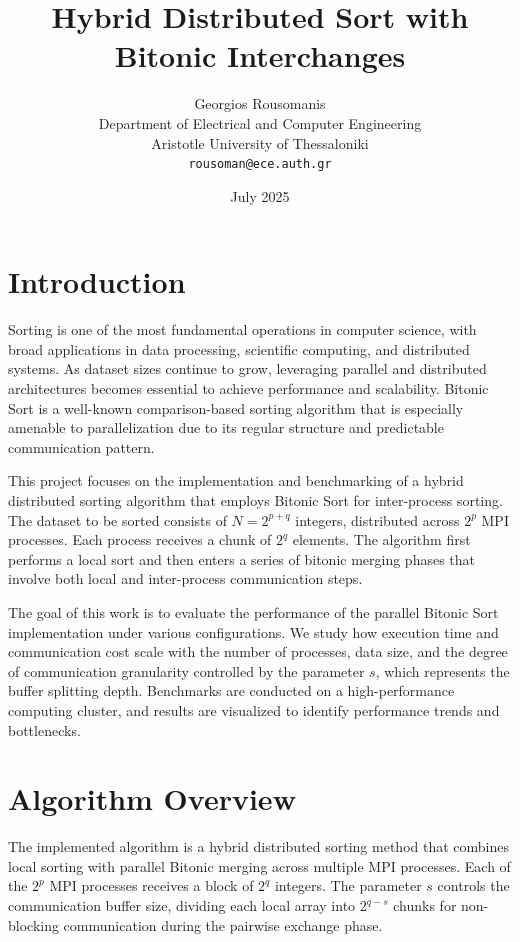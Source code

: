 \documentclass{article}
\title{Hybrid Distributed Sort with Bitonic Interchanges}
\author{Georgios Rousomanis \\
Department of Electrical and Computer Engineering \\
Aristotle University of Thessaloniki \\
\texttt{rousoman@ece.auth.gr}}
\date{July 2025}
\begin{document}
\maketitle

\section{Introduction}

Sorting is one of the most fundamental operations in computer science, with broad applications in data 
processing, scientific computing, and distributed systems. As dataset sizes continue to grow, leveraging 
parallel and distributed architectures becomes essential to achieve performance and scalability. 
Bitonic Sort is a well-known comparison-based sorting algorithm that is especially amenable to 
parallelization due to its regular structure and predictable communication pattern.

This project focuses on the implementation and benchmarking of a hybrid distributed sorting algorithm that 
employs Bitonic Sort for inter-process sorting. The dataset to be sorted consists of $N = 2^{p+q}$ integers,
distributed across $2^p$ MPI processes. Each process receives a chunk of $2^q$ elements. The algorithm first 
performs a local sort and then enters a series of bitonic merging phases that involve both local and 
inter-process communication steps.

The goal of this work is to evaluate the performance of the parallel Bitonic Sort implementation under various 
configurations. We study how execution time and communication cost scale with the number of processes, data size, 
and the degree of communication granularity controlled by the parameter $s$, which represents the buffer splitting
depth. Benchmarks are conducted on a high-performance computing cluster, and results are visualized to identify 
performance trends and bottlenecks.

\section{Algorithm Overview}

The implemented algorithm is a hybrid distributed sorting method that combines local sorting with 
parallel Bitonic merging across multiple MPI processes. Each of the $2^p$ MPI processes receives a 
block of $2^q$ integers. The parameter $s$ controls the communication buffer size, dividing each local 
array into $2^{q-s}$ chunks for non-blocking communication during the pairwise exchange phase.
\end{document}
